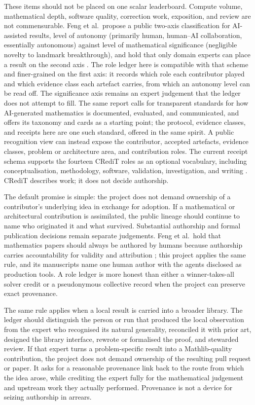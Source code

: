 \documentclass[10pt]{article}
\begin{document}
These items should not be placed on one scalar leaderboard.  Compute volume,
mathematical depth, software quality, correction work, exposition, and review
are not commensurable.  Feng et al.\ propose a public two-axis classification
for AI-assisted results, level of autonomy (primarily human, human--AI
collaboration, essentially autonomous) against level of mathematical
significance (negligible novelty to landmark breakthrough), and hold that
only domain experts can place a result on the second axis
\cite{autonomousmath}.  The role ledger here is compatible with that scheme
and finer-grained on the first axis: it records which role each contributor
played and which evidence class each artefact carries, from which an autonomy
level can be read off.  The significance axis remains an expert judgement
that the ledger does not attempt to fill.  The same report calls for
transparent standards for how AI-generated mathematics is documented,
evaluated, and communicated, and offers its taxonomy and cards as a starting
point; the protocol, evidence classes, and receipts here are one such
standard, offered in the same spirit.  A public recognition view can instead expose the
contributor, accepted artefacts, evidence classes, problem or architecture
area, and contribution roles.  The current receipt schema supports the
fourteen CRediT roles as an optional vocabulary, including conceptualisation,
methodology, software, validation, investigation, and writing
\cite{credit}.  CRediT describes work; it does not decide authorship.

The default promise is simple: the project does not demand ownership of a
contributor's underlying idea in exchange for adoption.  If a mathematical or
architectural contribution is assimilated, the public lineage should continue
to name who originated it and what survived.  Substantial authorship and
formal publication decisions remain separate judgements.  Feng et al.\ hold
that mathematics papers should always be authored by humans because
authorship carries accountability for validity and attribution
\cite{aletheia}; this project applies the same rule, and its manuscripts name
one human author with the agents disclosed as production tools.  A role ledger is
more honest than either a winner-takes-all solver credit or a pseudonymous
collective record when the project can preserve exact provenance.

The same rule applies when a local result is carried into a broader library.
The ledger should distinguish the person or run that produced the local
observation from the expert who recognised its natural generality, reconciled
it with prior art, designed the library interface, rewrote or formalised the
proof, and stewarded review.  If that expert turns a problem-specific result
into a Mathlib-quality contribution, the project does not demand ownership of
the resulting pull request or paper.  It asks for a reasonable provenance
link back to the route from which the idea arose, while crediting the expert
fully for the mathematical judgement and upstream work they actually
performed.  Provenance is not a device for seizing authorship in arrears.
\end{document}
